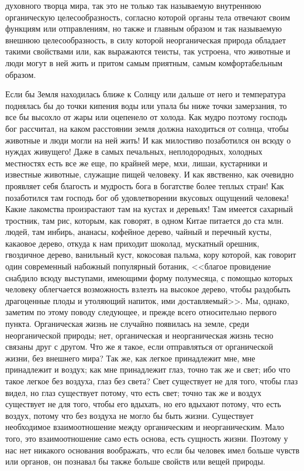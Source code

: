 \documentclass[12pt]{article}
\begin{document}
духовного творца мира, так это не только так называемую внутреннюю органическую целесообразность, согласно которой органы тела отвечают своим функциям или отправлениям, но также и главным образом и так называемую внешнюю целесообразность, в силу которой неорганическая природа обладает такими свойствами или, как выражаются теисты, так устроена, что животные и люди могут в ней жить и притом самым приятным, самым комфортабельным образом. 

Если бы Земля находилась ближе к Солнцу или дальше от него и температура поднялась бы до точки кипения воды или упала бы ниже точки замерзания, то все бы высохло от жары или оцепенело от холода. Как мудро поэтому господь бог рассчитал, на каком расстоянии земля должна находиться от солнца, чтобы животные и люди могли на ней жить! И как милостиво позаботился он всюду о нуждах живущего! Даже в самых печальных, неплодородных, холодных местностях есть все же еще, по крайней мере, мхи, лишаи, кустарники и известные животные, служащие пищей человеку. И как явственно, как очевидно проявляет себя благость и мудрость бога в богатстве более теплых стран! Как позаботился там господь бог об удовлетворении вкусовых ощущений человека! Какие лакомства произрастают там на кустах и деревьях! Там имеется сахарный тростник, там рис, которым, как говорят, в одном Китае питается до ста млн. людей, там инбирь, ананасы, кофейное дерево, чайный и перечный кусты, какаовое дерево, откуда к нам приходит шоколад, мускатный орешник, гвоздичное дерево, ванильный куст, кокосовая пальма, кору которой, как говорит один современный набожный популярный ботаник, <<благое провидение снабдило всюду выступами, имеющими форму полумесяца, с помощью которых человеку облегчается возможность взлезть на высокое дерево, чтобы раздобыть драгоценные плоды и утоляющий напиток, ими доставляемый>>. Мы, однако, заметим по этому поводу следующее, и прежде всего относительно первого пункта. Органическая жизнь не случайно появилась на земле, среди неорганической природы; нет, органическая и неорганическая жизнь тесно связаны друг с другом. Что же я такое, если отправляться от органической жизни, без внешнего мира? Так же, как легкое принадлежит мне, мне принадлежит и воздух; как мне принадлежит глаз, точно так же и свет; ибо что такое легкое без воздуха, глаз без света? Свет существует не для того, чтобы глаз видел, но глаз существует потому, что есть свет; точно так же и воздух существует не для того, чтобы его вдыхать, но его вдыхают потому, что есть воздух, потому что без воздуха не могло бы быть жизни. Существует необходимое взаимоотношение между органическим и неорганическим. Мало того, это взаимоотношение само есть основа, есть сущность жизни. Поэтому у нас нет никакого основания воображать, что если бы человек имел больше чувств или органов, он познавал бы также больше свойств или вещей природы. 
\end{document}
